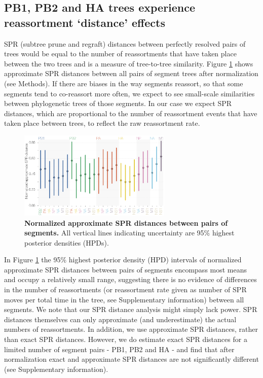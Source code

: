\documentclass[11pt,oneside,letterpaper]{article}
\begin{document}
\subsection*{PB1, PB2 and HA trees experience reassortment `distance' effects}
SPR (subtree prune and regraft) distances between perfectly resolved pairs of trees would be equal to the number of reassortments that have taken place between the two trees and is a measure of tree-to-tree similarity.
Figure \ref{SPRdistances} shows approximate SPR distances between all pairs of segment trees after normalization (see Methods).
If there are biases in the way segments reassort, so that some segments tend to co-reassort more often, we expect to see small-scale similarities between phylogenetic trees of those segments.
In our case we expect SPR distances, which are proportional to the number of reassortment events that have taken place between trees, to reflect the raw reassortment rate.

\begin{figure}[h]
	\centering		
	\includegraphics[width=0.65\textwidth]{figures/InfB_normalizedApproxSPR.png}
	\caption{\textbf{Normalized approximate SPR distances between pairs of segments.}
All vertical lines indicating uncertainty are 95\% highest posterior densities (HPDs).}
	\label{SPRdistances}
\end{figure}

In Figure \ref{SPRdistances} the 95\% highest posterior density (HPD) intervals of normalized approximate SPR distances between pairs of segments encompass most means and occupy a relatively small range, suggesting there is no evidence of differences in the number of reassortments (or reassortment rate given as number of SPR moves per total time in the tree, see Supplementary information) between all segments.
We note that our SPR distance analysis might simply lack power.
SPR distances themselves can only approximate (and underestimate) the actual numbers of reassortments.
In addition, we use approximate SPR distances, rather than exact SPR distances.
However, we do estimate exact SPR distances for a limited number of segment pairs - PB1, PB2 and HA - and find that after normalization exact and approximate SPR distances are not significantly different (see Supplementary information). 
\end{document}
